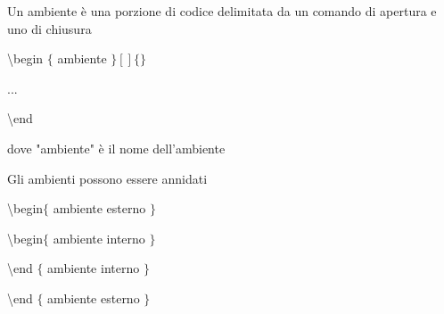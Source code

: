 \documentclass[a4]{article}
\begin{document}
Un ambiente è una porzione di codice delimitata da un comando di apertura e uno di chiusura

\textbackslash begin $\{$ ambiente $\} [ ] \{ \}$

...

\textbackslash end

dove "ambiente" è il nome dell'ambiente

Gli ambienti possono essere annidati

\textbackslash begin$\{$ ambiente esterno $\}$

\textbackslash begin$\{$ ambiente interno $\}$

\textbackslash end $\{$ ambiente interno $\}$

\textbackslash end $\{$ ambiente esterno $\}$
\end{document}
